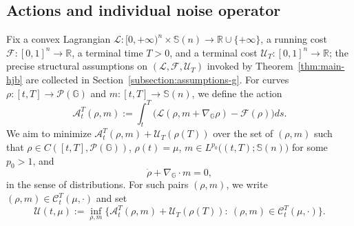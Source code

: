 \documentclass[10pt]{article}
\numberwithin{equation}{section}
\newcommand{\cA}{ \mathcal{A}}
\newcommand{\cC}{ \mathcal{C}}
\newcommand{\cF}{ \mathcal{F}}
\newcommand{\cL}{ \mathcal{L}}
\newcommand{\cP}{ \mathcal{P}}
\newcommand{\cU}{ \mathcal{U}}
\newcommand{\mP}{ \mathcal{P}}
\newcommand{\bG}{\mathbb G}
\newcommand{\bR}{\mathbb R}
\newcommand{\bS}{\mathbb S}
\newcommand{\bV}{\mathbb V}
\def\cL{\mathcal{L}}
\begin{document}
\subsection{Actions and individual noise operator}\label{subsection:feb14.2026}
Fix a convex Lagrangian $\cL:[0,+\infty)^n\times\bS(n)\to\bR\cup\{+\infty\}$, a running cost $\cF:[0,1]^n\to\bR$, a terminal time $T>0$, and a terminal cost $\cU_T:[0,1]^n\to\bR$; the precise structural assumptions on $(\cL,\cF,\cU_T)$ invoked by Theorem~\ref{thm:main-hjb} are collected in Section~\ref{subsection:assumptions-g}. For curves $\rho:[t,T]\to \mP(\mathbb{G})$ and $m:[t,T]\to \mathbb{S}(n)$, we define the action
\[
\cA_t^T(\rho,  m):= \int_t^T  \Big(\cL(\rho,  m+  \nabla_\bG \rho) -\cF(\rho)\Big)ds.
\]
We aim to minimize $\cA_t^T(\rho,  m)+ \cU_T(\rho(T))$
over the set of $(\rho, m)$ such that $\rho \in C([t, T], \cP(\bG))$, $\rho(t)=\mu$, $m \in L^{p_0}\big((t, T); \bS(n)\big)$ for some $p_0>1$, and 
\begin{equation}\label{eq:may-continuity.ter}
\dot \rho+\nabla_\bG \cdot m=0,
\end{equation} 
in the sense of distributions. %
For such pairs $(\rho,m)$, we write $(\rho, m) \in \cC_t^T(\mu, \cdot)$ and set
\begin{equation}\label{eq:aug01.2025.2}
\cU(t, \mu):= \inf_{\rho, m} \bigg\{ \cA_{t}^{T}(\rho, m) + \cU_T(\rho(T)):\: (\rho, m) \in \cC_t^T(\mu, \cdot) \bigg\}.
\end{equation}
\end{document}
